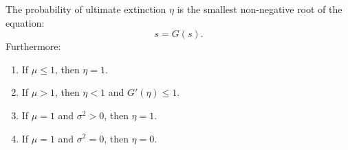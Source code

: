 \documentclass{huhtakm-template-book-v2}
\begin{document}
    \begin{thm}
        The probability of ultimate extinction $\eta$ is the smallest non-negative root of the equation:
        \begin{equation*}
            s = G(s).
        \end{equation*}
        Furthermore:
        \begin{enumerate}
            \item If $\mu \leq 1$, then $\eta = 1$.
            \item If $\mu > 1$, then $\eta < 1$ and $G'(\eta) \leq 1$.
            \item If $\mu = 1$ and $\sigma^{2} > 0$, then $\eta = 1$.
            \item If $\mu = 1$ and $\sigma^{2} = 0$, then $\eta = 0$.
        \end{enumerate}
    \end{thm}
\end{document}
